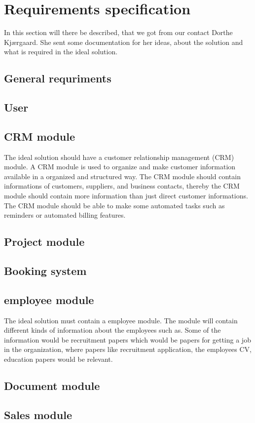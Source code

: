 \section{Requirements specification}
In this section will there be described, that we got from our contact Dorthe Kjærgaard. She sent some documentation for her ideas, about the solution and what is required in the ideal solution. 

\subsection{General requriments}

\subsection{User}


\subsection{CRM module}

The ideal solution should have a customer relationship management (CRM) module. A CRM module is used to organize and make customer information available in a organized and structured way. The CRM module should contain informations of customers, suppliers, and business contacts, thereby the CRM module should contain more information than just direct customer informations.\\

The CRM module should be able to make some automated tasks such as reminders or automated billing features. 

\subsection{Project module}

\subsection{Booking system}

\subsection{employee module}
The ideal solution must contain a employee module. The module will contain different kinds of information about the employees such as. Some of the information would be recruitment papers which would be papers for getting a job in the organization, where papers like recruitment application, the employees CV, education papers would be relevant. 

\subsection{Document module}

\subsection{Sales module}